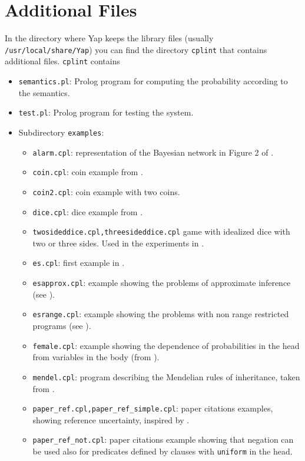 \documentclass[a4paper,12pt]{article}
\begin{document}
\section{Additional Files}
In the directory where Yap keeps the library files (usually \texttt{/usr/local/share/Yap}) you can find the directory \texttt{cplint} that contains additional files.
\texttt{cplint} contains
\begin{itemize}
\item \texttt{semantics.pl}: Prolog program for computing the probability according to the semantics.
\item \texttt{test.pl}: Prolog program for testing the system. 
\item Subdirectory \texttt{examples}:
\begin{itemize}
\item \texttt{alarm.cpl}: representation of the Bayesian network in Figure 2 of
 \cite{VenVer04-ICLP04-IC}.
\item \texttt{coin.cpl}: coin example from   \cite{VenVer04-ICLP04-IC}.
\item \texttt{coin2.cpl}: coin example with two coins.
\item \texttt{dice.cpl}: dice example from \cite{VenVer04-ICLP04-IC}.
\item \verb|twosideddice.cpl,threesideddice.cpl|  game with idealized dice with two or three  sides. Used in the experiments in \cite{Rig-RCRA07-IC}.
\item \texttt{es.cpl}: first example in \cite{Rig-RCRA07-IC}.
\item \texttt{esapprox.cpl}: example showing the problems of approximate inference (see \cite{Rig-RCRA07-IC}).
\item \texttt{esrange.cpl}: example showing the problems with non range restricted programs (see \cite{Rig-RCRA07-IC}).
\item \texttt{female.cpl}: example showing the dependence of probabilities in the head from variables in the body (from \cite{VenVer04-ICLP04-IC}).
\item \texttt{mendel.cpl}: program describing the Mendelian rules of inheritance, taken from \cite{Blo04-ILP04WIP-IC}.
\item \verb|paper_ref.cpl,paper_ref_simple.cpl|: paper citations examples, showing reference uncertainty, inspired by \cite{Getoor+al:JMLR02}.
\item \verb|paper_ref_not.cpl|: paper citations example showing that negation can be used also for predicates defined by clauses with \texttt{uniform} in the head.

\end{itemize}
\end{itemize}
\end{document}
